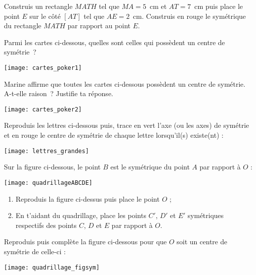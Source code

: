 \begin{exercice}
Construis un rectangle $MATH$ tel que $MA = 5$ cm et $AT = 7$ cm puis place le point $E$ sur le côté $[AT]$ tel que $AE = 2$ cm. Construis en rouge le symétrique du rectangle $MATH$ par rapport au point $E$.
\end{exercice}


\begin{exercice}
Parmi les cartes ci-dessous, quelles sont celles qui possèdent un centre de symétrie ? 
 \begin{center} \texttt{[image: cartes\_poker1]} \end{center}
\end{exercice}


\begin{exercice}
Marine affirme que toutes les cartes ci-dessous possèdent un centre de symétrie. A-t-elle raison ? Justifie ta réponse.
 \begin{center} \texttt{[image: cartes\_poker2]} \end{center}
\end{exercice}


\begin{exercice}
Reproduis les lettres ci-dessous puis, trace en vert l'axe (ou les axes) de symétrie et en rouge le centre de symétrie de chaque lettre lorsqu'il(s) existe(nt) :
 \begin{center} \texttt{[image: lettres\_grandes]} \end{center}
\end{exercice}


\begin{exercice}
Sur la figure ci-dessous, le point $B$ est le symétrique du point $A$ par rapport à $O$ :
 \begin{center} \texttt{[image: quadrillageABCDE]} \end{center}
\begin{enumerate}
 \item Reproduis la figure ci-dessus puis place le point $O$ ;
 \item En t'aidant du quadrillage, place les points $C'$, $D'$ et $E'$ symétriques respectifs des points $C$, $D$ et $E$ par rapport à $O$.
 \end{enumerate}
\end{exercice}


\begin{exercice}
Reproduis puis complète la figure ci-dessous pour que $O$ soit un centre de symétrie de celle-ci :
 \begin{center} \texttt{[image: quadrillage\_figsym]} \end{center}
\end{exercice}


